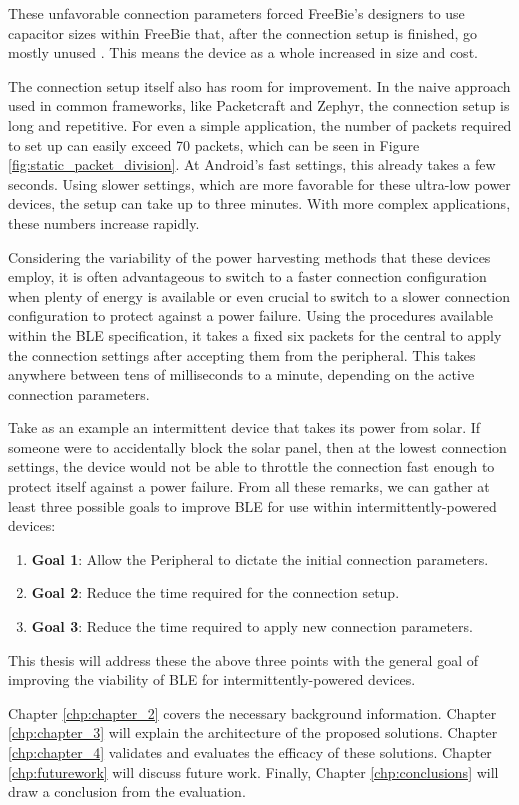 These unfavorable connection parameters forced FreeBie's designers to use capacitor sizes within FreeBie that, after the connection setup is finished, go mostly unused \cite{freebie}. This means the device as a whole increased in size and cost. 

The connection setup itself also has room for improvement. In the naive approach used in common frameworks, like Packetcraft and Zephyr, the connection setup is long and repetitive. For even a simple application, the number of packets required to set up can easily exceed 70 packets, which can be seen in Figure \ref{fig:static_packet_division}. At Android's fast settings, this already takes a few seconds. Using slower settings, which are more favorable for these ultra-low power devices, the setup can take up to three minutes. With more complex applications, these numbers increase rapidly.

Considering the variability of the power harvesting methods that these devices employ, it is often advantageous to switch to a faster connection configuration when plenty of energy is available or even crucial to switch to a slower connection configuration to protect against a power failure. Using the procedures available within the BLE specification, it takes a fixed six packets for the central to apply the connection settings after accepting them from the peripheral. This takes anywhere between tens of milliseconds to a minute, depending on the active connection parameters. 

Take as an example an intermittent device that takes its power from solar. If someone were to accidentally block the solar panel, then at the lowest connection settings, the device would not be able to throttle the connection fast enough to protect itself against a power failure. From all these remarks, we can gather at least three possible goals to improve BLE for use within intermittently-powered devices:
\begin{enumerate}
    \item \textbf{Goal 1}: Allow the Peripheral to dictate the initial connection parameters.
    \item \textbf{Goal 2}: Reduce the time required for the connection setup.
    \item \textbf{Goal 3}: Reduce the time required to apply new connection parameters.
\end{enumerate}
This thesis will address these the above three points with the general goal of improving the viability of BLE for intermittently-powered devices.

Chapter \ref{chp:chapter_2} covers the necessary background information. Chapter \ref{chp:chapter_3} will explain the architecture of the proposed solutions. Chapter \ref{chp:chapter_4} validates and evaluates the efficacy of these solutions. Chapter \ref{chp:futurework} will discuss future work. Finally, Chapter \ref{chp:conclusions} will draw a conclusion from the evaluation.
